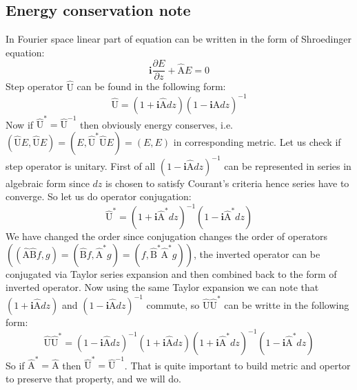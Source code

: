 \documentclass{article}
\newcommand{\dd}{\partial}
\newcommand{\ff}{\frac}
\newcommand{\ci}{\mathbf{i}}
\newcommand{\op}[1]{\hat{\mathrm{#1}}}
\begin{document}
\subsection{Energy conservation note}
In Fourier space linear part of equation can be written in the form of Shroedinger equation:
\[ \ci\ff{\dd E}{\dd z} + \op A E = 0 \]
Step operator $\op U$ can be found in the following form:
\[ \op U = (1 + \ci \op A dz) (1 - \ci \op A dz)^{-1} \]
Now if $\op U^* = \op U^{-1}$ then obviously energy conserves, i.e. $(\op U E,\op U E) = (E, \op U^* \op U E) = (E, E)$ in corresponding metric.
Let us check if step operator is unitary. First of all $(1 - \ci \op A dz)^{-1}$ can be represented in series in algebraic form since $dz$ is chosen to satisfy Courant's criteria hence series have to converge. So let us do operator conjugation:
\[ \op U^* = (1+\ci \op A^* dz)^{-1}(1-\ci \op A^* dz) \]
We have changed the order since conjugation changes the order of operators $((\op A \op B f , g)=(\op B f , \op A^* g)=(f , \op B^* \op A^* g))$, the inverted operator can be conjugated via Taylor series expansion and then combined back to the form of inverted operator. Now using the same Taylor expansion we can note that $(1 + \ci \op A dz)$ and $(1 - \ci \op A dz)^{-1}$ commute, so $\op U \op U^*$ can be writte in the following form:
\[ \op U \op U^* = (1 - \ci \op A dz)^{-1} (1 + \ci \op A dz) (1+\ci \op A^* dz)^{-1}(1-\ci \op A^* dz) \]
So if $\op A^*=\op A$ then $\op U^* = \op U^{-1}$.
That is quite important to build metric and opertor to preserve that property, and we will do.
\end{document}
